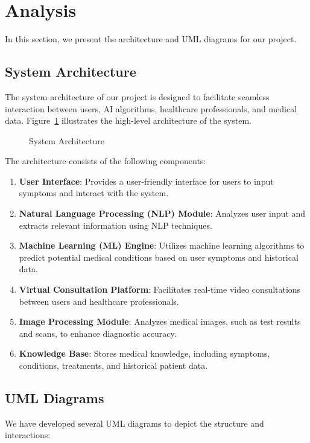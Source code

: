 \documentclass[onecolumn]{article}
\begin{document}
\section{Analysis}
In this section, we present the architecture and UML diagrams for our project.

\subsection{System Architecture}
The system architecture of our project is designed to facilitate seamless interaction between users, AI algorithms, healthcare professionals, and medical data. Figure~\ref{fig:architecture} illustrates the high-level architecture of the system.

\begin{figure}[ht]
\centering
\caption{System Architecture}\label{fig:architecture}
\end{figure}

\newpage
The architecture consists of the following components:
\begin{enumerate}
\item \textbf{User Interface}: Provides a user-friendly interface for users to input symptoms and interact with the system.
\item \textbf{Natural Language Processing (NLP) Module}: Analyzes user input and extracts relevant information using NLP techniques.
\item \textbf{Machine Learning (ML) Engine}: Utilizes machine learning algorithms to predict potential medical conditions based on user symptoms and historical data.
\item \textbf{Virtual Consultation Platform}: Facilitates real-time video consultations between users and healthcare professionals.
\item \textbf{Image Processing Module}: Analyzes medical images, such as test results and scans, to enhance diagnostic accuracy.
\item \textbf{Knowledge Base}: Stores medical knowledge, including symptoms, conditions, treatments, and historical patient data.
\end{enumerate}

\subsection{UML Diagrams}
We have developed several UML diagrams to depict the structure and interactions:
\end{document}
